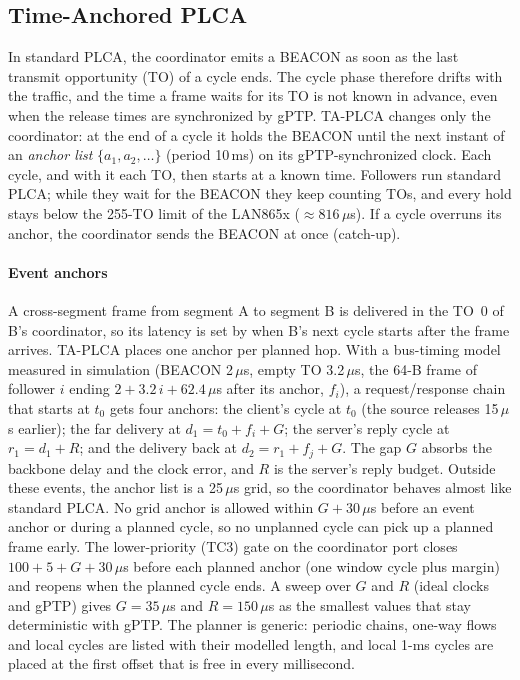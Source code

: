 
\subsection{Time-Anchored PLCA}
In standard PLCA, the coordinator emits a BEACON as soon as the last transmit
opportunity (TO) of a cycle ends. The cycle phase therefore drifts with the traffic,
and the time a frame waits for its TO is not known in advance, even when the
release times are synchronized by gPTP. TA-PLCA changes only the coordinator: at the
end of a cycle it holds the BEACON until the next instant of an \emph{anchor list}
$\{a_1, a_2, \dots\}$ (period 10\,ms) on its gPTP-synchronized clock. Each cycle, and
with it each TO, then starts at a known time. Followers run standard PLCA; while they
wait for the BEACON they keep counting TOs, and every hold stays below the 255-TO limit
of the LAN865x ($\approx 816\,\mu$s). If a cycle overruns its anchor, the coordinator
sends the BEACON at once (catch-up).

\paragraph{Event anchors}
A cross-segment frame from segment A to segment B is delivered in the TO~0 of B's
coordinator, so its latency is set by when B's next cycle starts after the frame
arrives. TA-PLCA places one anchor per planned hop. With a bus-timing model measured
in simulation (BEACON 2\,$\mu$s, empty TO 3.2\,$\mu$s, the 64-B frame of follower $i$
ending $2 + 3.2\,i + 62.4\,\mu$s after its anchor, $f_i$), a request/response chain
that starts at $t_0$ gets four anchors:
the client's cycle at $t_0$ (the source releases 15\,$\mu$s earlier);
the far delivery at $d_1 = t_0 + f_i + G$;
the server's reply cycle at $r_1 = d_1 + R$;
and the delivery back at $d_2 = r_1 + f_j + G$.
The gap $G$ absorbs the backbone delay and the clock error, and $R$ is the server's
reply budget. Outside these events, the anchor list is a 25\,$\mu$s grid, so the
coordinator behaves almost like standard PLCA. No grid anchor is allowed within
$G + 30\,\mu$s before an event anchor or during a planned cycle, so no unplanned cycle
can pick up a planned frame early. The lower-priority (TC3) gate on the coordinator
port closes $100 + 5 + G + 30\,\mu$s before each planned anchor (one window cycle plus
margin) and reopens when the planned cycle ends. A sweep over $G$ and $R$ (ideal clocks
and gPTP) gives $G = 35\,\mu$s and $R = 150\,\mu$s as the smallest values that stay
deterministic with gPTP. The planner is generic: periodic chains, one-way flows and
local cycles are listed with their modelled length, and local 1-ms cycles are placed
at the first offset that is free in every millisecond.

